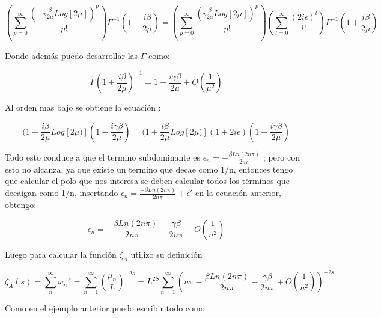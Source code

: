 \begin{equation}
    \left(
    \sum _{p = 0} ^{\infty} 
    \frac{(-i \frac{\beta}{2 \mu} Log[2 \mu] ) ^p }{p!}
    \right)
    \Gamma ^{-1} (1 -\frac{i \beta}{2 \mu})
    =
    \left(
    \sum _{p = 0} ^{\infty} \frac{( i \frac{\beta}{2 \mu} Log[2 \mu]) ^p }{p!}
    \right)
    \left(
    \sum _{l = 0} ^{\infty} \frac{(2 i \epsilon)^l}{l !}
    \right)
    \Gamma ^{-1} (1+ \frac{i \beta}{2 \mu})
\end{equation}

Donde además puedo desarrollar las $\Gamma$ como: 

\begin{equation}
    \Gamma(1 \pm \frac{i \beta}{2 \mu})^{-1} = 1 \pm \frac{i \gamma \beta }{2 \mu }
    + O(\frac{1}{\mu ^2})
\end{equation}

Al orden mas bajo se obtiene la ecuación : 

\begin{equation}
(1- \frac{i \beta}{2 \mu} Log[2 \mu)] (1- \frac{i \gamma \beta}{2 \mu}) =
(1+ \frac{i \beta}{2 \mu} Log[2 \mu)]
(1+ 2 i \epsilon)
(1 + \frac{i \gamma \beta}{2 \mu})
\end{equation}

Todo esto conduce a que el termino subdominante es $\epsilon _n = - \frac{\beta Ln(2 n \pi)}{2 n \pi}$ , pero con esto no alcanza, ya que existe un termino que decae como 1/n, entonces tengo que calcular el polo que nos interesa se deben calcular todos los términos que decaigan como 1/n, insertando $\epsilon _n =  \frac{-\beta Ln(2 n \pi)}{2 n \pi} + \epsilon '$ en la ecuación anterior, obtengo:


\begin{equation}
    \epsilon _n =  \frac{-\beta Ln(2 n \pi)}{2 n \pi} 
                -\frac{\gamma \beta}{2 n \pi} +
                O(\frac{1}{n^2})
\end{equation}

Luego para calcular la función $\zeta _{A}$ utilizo su definición

\begin{equation}
    \zeta _A (s) = \sum _n ^{\infty} \omega _n ^{-s}  =
    \sum _{n=1} ^{\infty} \left(\frac{\mu _n}{L} \right) ^{-2 s} = 
    L ^{2 S} \sum _{n=1} ^{\infty} 
    \left( 
    n \pi - \frac{\beta Ln(2 n \pi)}{2 n \pi} - \frac{\gamma \beta}{2 n \pi} +
    O(\frac{1}{n^2})
    \right) ^{-2s}
\end{equation}

Como en el ejemplo anterior puedo escribir todo como


